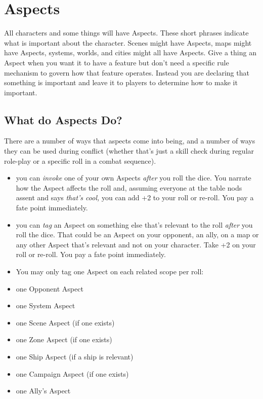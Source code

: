 \section{Aspects}\label{sec:aspects}  %

All characters and some things will have Aspects. These short phrases indicate what is important about the character. Scenes might have Aspects, maps might have Aspects, systems, worlds, and cities might all have Aspects. Give a thing an Aspect when you want it to have a feature but don't need a specific rule mechanism to govern how that feature operates. Instead you are declaring that something is important and leave it to players to determine how to make it important.

\subsection{What do Aspects Do?}\label{sec:what-do-aspects-do} %

There are a number of ways that aspects come into being, and a number of ways they can be used during conflict (whether that's just a skill check during regular role-play or a specific roll in a combat sequence).


\begin{itemize}
\item you can \emph{invoke} one of your own Aspects \emph{after} you roll the dice. You narrate how the Aspect affects the roll and, assuming everyone at the table nods assent and says \emph{that's cool,} you can add +2 to your roll or re-roll. You pay a fate point immediately.

\item you can \emph{tag} an Aspect on something else that's relevant to the roll \emph{after} you roll the dice. That could be an Aspect on your opponent, an ally, on a map  or any other Aspect that's relevant and not on your character. Take +2 on your roll or re-roll. You pay a fate point immediately.

\item You may only tag one Aspect on each related scope per roll:
\end{itemize}

\begin{itemize}
\item one Opponent Aspect
\item one System Aspect
\item one Scene Aspect (if one exists)
\item one Zone Aspect (if one exists)
\item one Ship Aspect (if a ship is relevant)
\item one Campaign Aspect (if one exists)
\item one Ally's Aspect
\end{itemize}

